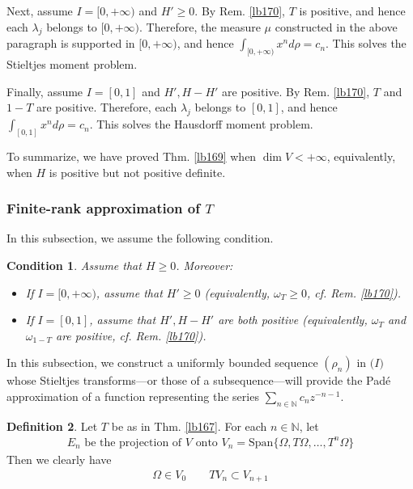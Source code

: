 \documentclass[12pt,b5paper,notitlepage]{article}
\theoremstyle{definition}
\newtheorem{df}{Definition}[subsection]
\theoremstyle{plain}
\newtheorem{cond}[df]{Condition}
\newcommand{\Span}{\mathrm{Span}}
\newcommand{\scr}{\mathscr}
\newcommand{\Nbb}{\mathbb N}
\numberwithin{equation}{section}
\begin{document}
Next, assume $I=[0,+\infty)$ and $H'\geq0$. By Rem. \ref{lb170}, $T$ is positive, and hence each $\lambda_j$ belongs to $[0,+\infty)$. Therefore, the measure $\mu$ constructed in the above paragraph is supported in $[0,+\infty)$, and hence $\int_{[0,+\infty)}x^nd\rho=c_n$. This solves the Stieltjes moment problem.

Finally, assume $I=[0,1]$ and $H',H-H'$ are positive. By Rem. \ref{lb170}, $T$ and $1-T$ are positive. Therefore, each $\lambda_j$ belongs to $[0,1]$, and hence $\int_{[0,1]}x^nd\rho=c_n$. This solves the Hausdorff moment problem.

To summarize, we have proved Thm. \ref{lb169} when $\dim V<+\infty$, equivalently, when $H$ is positive but not positive definite.





\subsubsection{Finite-rank approximation of $T$}


In this subsection, we assume the following condition.

\begin{cond}\label{lb178}
Assume that $H\geq0$. Moreover:
\begin{itemize}
\item If $I=[0,+\infty)$, assume that $H'\geq0$ (equivalently, $\omega_T\geq0$, cf. Rem. \ref{lb170}).
\item If $I=[0,1]$, assume that $H',H-H'$ are both positive (equivalently, $\omega_T$ and $\omega_{1-T}$ are positive, cf. Rem. \ref{lb170}). 
\end{itemize}
\end{cond}


In this subsection, we construct a uniformly bounded sequence $(\rho_n)$ in $\scr (I)$ whose Stieltjes transforms---or those of a subsequence---will provide the Pad\'e approximation of a function representing the series $\sum_{n\in\Nbb}c_nz^{-n-1}$.

\begin{df}\label{lb189}
Let $T$ be as in Thm. \ref{lb167}. For each $n\in\Nbb$, let
\begin{align*}
E_n\text{ be the projection of $V$ onto }V_n=\Span\{\Omega,T\Omega,\dots,T^n\Omega\}
\end{align*}
Then we clearly have
\begin{align}\label{eq84}
\Omega\in V_0\qquad TV_n\subset V_{n+1}
\end{align}
\end{df}
\end{document}
